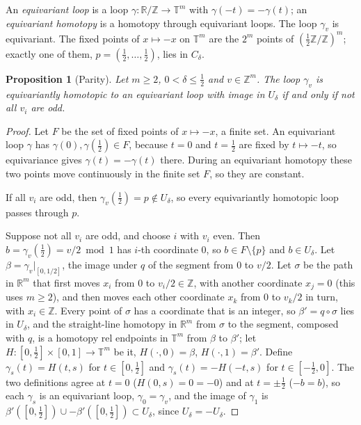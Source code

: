 \documentclass[11pt]{article}
\newtheorem{proposition}[theorem]{Proposition}
\theoremstyle{remark}
\newcommand{\Z}{\mathbb{Z}}
\newcommand{\R}{\mathbb{R}}
\begin{document}
An \emph{equivariant loop} is a loop $\gamma:\R/\Z\to\mathbb T^m$ with $\gamma(-t)=-\gamma(t)$; an \emph{equivariant homotopy} is a homotopy through equivariant loops. The loop $\gamma_v$ is equivariant. The fixed points of $x\mapsto-x$ on $\mathbb T^m$ are the $2^m$ points of $(\frac12\Z/\Z)^m$; exactly one of them, $p=(\frac12,\dots,\frac12)$, lies in $C_\delta$.

\begin{proposition}[Parity]\label{prop:equiv}
Let $m\ge2$, $0<\delta\le\frac12$ and $v\in\Z^m$. The loop $\gamma_v$ is equivariantly homotopic to an equivariant loop with image in $U_\delta$ if and only if not all $v_i$ are odd.
\end{proposition}
\begin{proof}
Let $F$ be the set of fixed points of $x\mapsto-x$, a finite set. An equivariant loop $\gamma$ has $\gamma(0),\gamma(\frac12)\in F$, because $t=0$ and $t=\frac12$ are fixed by $t\mapsto-t$, so equivariance gives $\gamma(t)=-\gamma(t)$ there. During an equivariant homotopy these two points move continuously in the finite set $F$, so they are constant.

If all $v_i$ are odd, then $\gamma_v(\frac12)=p\notin U_\delta$, so every equivariantly homotopic loop passes through $p$.

Suppose not all $v_i$ are odd, and choose $i$ with $v_i$ even. Then $b=\gamma_v(\frac12)=v/2\bmod 1$ has $i$-th coordinate $0$, so $b\in F\setminus\{p\}$ and $b\in U_\delta$. Let $\beta=\gamma_v|_{[0,1/2]}$, the image under $q$ of the segment from $0$ to $v/2$. Let $\sigma$ be the path in $\R^m$ that first moves $x_i$ from $0$ to $v_i/2\in\Z$, with another coordinate $x_j=0$ (this uses $m\ge2$), and then moves each other coordinate $x_k$ from $0$ to $v_k/2$ in turn, with $x_i\in\Z$. Every point of $\sigma$ has a coordinate that is an integer, so $\beta'=q\circ\sigma$ lies in $U_\delta$, and the straight-line homotopy in $\R^m$ from $\sigma$ to the segment, composed with $q$, is a homotopy rel endpoints in $\mathbb T^m$ from $\beta$ to $\beta'$; let $H:[0,\frac12]\times[0,1]\to\mathbb T^m$ be it, $H(\cdot,0)=\beta$, $H(\cdot,1)=\beta'$. Define $\gamma_s(t)=H(t,s)$ for $t\in[0,\frac12]$ and $\gamma_s(t)=-H(-t,s)$ for $t\in[-\frac12,0]$. The two definitions agree at $t=0$ ($H(0,s)=0=-0$) and at $t=\pm\frac12$ ($-b=b$), so each $\gamma_s$ is an equivariant loop, $\gamma_0=\gamma_v$, and the image of $\gamma_1$ is $\beta'([0,\frac12])\cup-\beta'([0,\frac12])\subset U_\delta$, since $U_\delta=-U_\delta$.
\end{proof}
\end{document}
